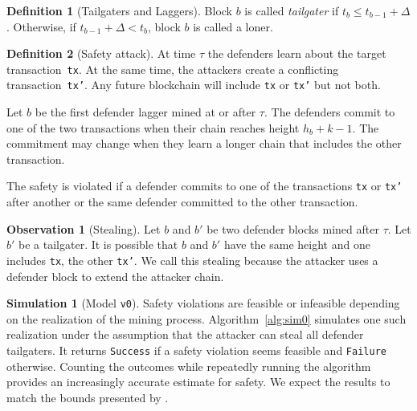 \documentclass[12pt]{article}
\theoremstyle{definition}
\newtheorem{definition}{Definition}
\newtheorem{observation}{Observation}
\newtheorem{simulation}{Simulation}
\begin{document}
\begin{definition}[Tailgaters and Laggers]
  Block $b$ is called \emph{tailgater} if $t_b \leq t_{b-1} + \Delta$.
  Otherwise, if  $t_{b-1} + \Delta < t_b$, block $b$ is called a loner.
\end{definition}

\begin{definition}[Safety attack] \label{def:safety}
  At time $\tau$ the defenders learn about the target transaction~\texttt{tx}.
  At the same time, the attackers create a conflicting transaction~\texttt{tx'}.
  Any future blockchain will include \texttt{tx} or \texttt{tx'} but not both.

  Let $b$ be the first defender lagger mined at or after $\tau$.
  The defenders commit to one of the two transactions when their chain reaches height $h_b + k - 1$.
  The commitment may change when they learn a longer chain that includes the other transaction.

  The safety is violated if a defender commits to one of the transactions \texttt{tx} or \texttt{tx'} after another or the same defender committed to the other transaction.
\end{definition}

\begin{observation}[Stealing]
  Let $b$ and $b'$ be two defender blocks mined after $\tau$.
  Let $b'$ be a tailgater.
  It is possible that $b$ and $b'$ have the same height and one includes \texttt{tx}, the other \texttt{tx'}.
  We call this stealing because the attacker uses a defender block to extend the attacker chain.
\end{observation}

\begin{simulation}[Model \texttt{v0}] \label{sim:v0}
  Safety violations are feasible or infeasible depending on the realization of the mining process.
  Algorithm~\ref{alg:sim0} simulates one such realization under the assumption that the attacker can steal all defender tailgaters.
  It returns \texttt{Success} if a safety violation seems feasible and \texttt{Failure} otherwise.
  Counting the outcomes while repeatedly running the algorithm provides an increasingly accurate estimate for safety.
  We expect the results to match the bounds presented by \citet{guo2022BitcoinLatency}.
\end{simulation}
\end{document}
